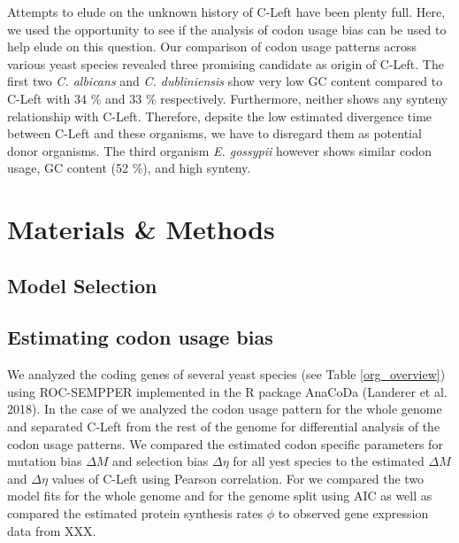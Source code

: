 \documentclass[12pt]{article}
\begin{document}
Attempts to elude on the unknown history of C-Left have been plenty full.
Here, we used the opportunity to see if the analysis of codon usage bias can be used to help elude on this question.
Our comparison of codon usage patterns across various yeast species revealed three promising candidate as origin of C-Left.
The first two \textit{C. albicans} and \textit{C. dubliniensis} show very low GC content compared to C-Left with 34 \% and 33 \% respectively. 
Furthermore, neither shows any synteny relationship with C-Left.
Therefore, depsite the low estimated divergence time between C-Left and these organisms, we have to disregard them as potential donor organisms. 
The third organism \textit{E. gossypii} however shows similar codon usage, GC content (52 \%), and high synteny.  


\section*{Materials \& Methods}

\subsection*{Model Selection}

\subsection*{Estimating codon usage bias}
We analyzed the coding genes of several yeast species (see Table \ref{org_overview}) using ROC-SEMPPER \citep{gilchrist2015} implemented in the R package AnaCoDa (Landerer et al. 2018).
In the case of \kluyveri we analyzed the codon usage pattern for the whole genome and separated C-Left from the rest of the genome for differential analysis of the codon usage patterns.
We compared the estimated codon specific parameters for mutation bias $\Delta M$ and selection bias $\Delta \eta$ for all yest species to the estimated $\Delta M$ and $\Delta \eta$ values of C-Left using Pearson correlation.
For \kluyveri we compared the two model fits for the whole genome and for the genome split using AIC as well as compared the estimated protein synthesis rates $\phi$ to observed gene expression data from XXX.
\end{document}
